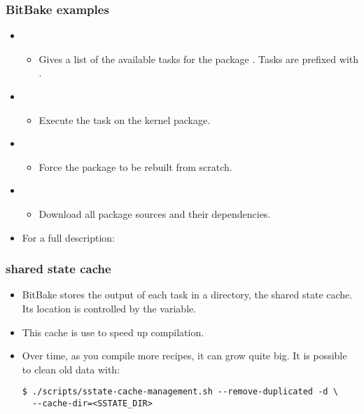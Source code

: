 \begin{frame}
  \frametitle{BitBake examples}
  \begin{itemize}
    \item {}
    \begin{itemize}
      \item Gives a list of the available tasks for the package
      . Tasks are prefixed with .
    \end{itemize}
    \item {}
    \begin{itemize}
      \item Execute the task  on the kernel package.
    \end{itemize}
    \item {}
    \begin{itemize}
      \item Force the  package to be rebuilt from
        scratch.
    \end{itemize}
    \item {}
    \begin{itemize}
      \item Download all package sources and their dependencies.
    \end{itemize}
    \item For a full description: 
  \end{itemize}
\end{frame}

\begin{frame}[fragile]
  \frametitle{shared state cache}
  \begin{itemize}
    \item BitBake stores the output of each task in a directory, the
      shared state cache. Its location is controlled by the
       variable.
    \item This cache is use to speed up compilation.
    \item Over time, as you compile more recipes, it can grow quite
      big. It is possible to clean old data with:
      \begin{block}{}
        \begin{verbatim}
$ ./scripts/sstate-cache-management.sh --remove-duplicated -d \
  --cache-dir=<SSTATE_DIR>
        \end{verbatim}
      \end{block}
  \end{itemize}
\end{frame}

